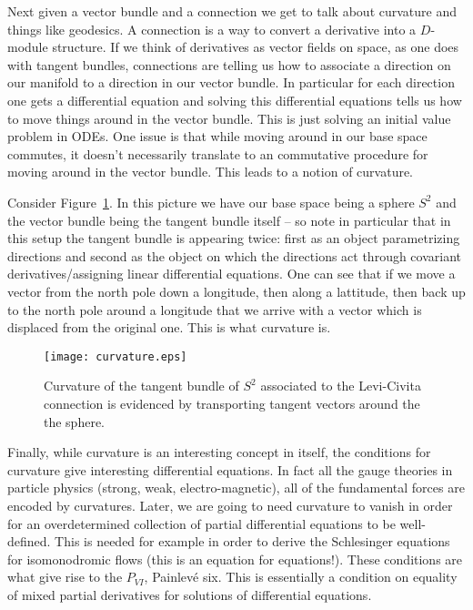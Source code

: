 \documentclass[12pt]{book}
\numberwithin{equation}{section}
\theoremstyle{definition}
\theoremstyle{remark}
\begin{document}
Next given a vector bundle and a connection we get to talk about curvature and things like geodesics. 
A connection is a way to convert a derivative into a $D$-module structure.
If we think of derivatives as vector fields on space, as one does with tangent bundles, connections are telling us how to associate a direction on our manifold to a direction in our vector bundle. 
In particular for each direction one gets a differential equation and solving this differential equations tells us how to move things around in the vector bundle. 
This is just solving an initial value problem in ODEs.
One issue is that while moving around in our base space commutes, it doesn't necessarily translate to an commutative procedure for moving around in the vector bundle. 
This leads to a notion of curvature. 

Consider Figure~\ref{F:curvature}. 
In this picture we have our base space being a sphere $S^2$ and the vector bundle being the tangent bundle itself -- so note in particular that in this setup the tangent bundle is appearing twice: first as an object parametrizing directions and second as the object on which the directions act through covariant derivatives/assigning linear differential equations.
One can see that if we move a vector from the north pole down a longitude, then along a lattitude, then back up to the north pole around a longitude that we arrive with a vector which is displaced from the original one. 
This is what curvature is.
\begin{figure}[h]\label{F:curvature}
	\begin{center}
		\texttt{[image: curvature.eps]}
	\end{center}
	\caption{Curvature of the tangent bundle of $S^2$ associated to the Levi-Civita connection is evidenced by transporting tangent vectors around the the sphere.}
\end{figure}

Finally, while curvature is an interesting concept in itself, the conditions for curvature give interesting differential equations. 
In fact all the gauge theories in particle physics (strong, weak, electro-magnetic), all of the fundamental forces are encoded by curvatures. 
Later, we are going to need curvature to vanish in order for an overdetermined collection of partial differential equations to be well-defined.
This is needed for example in order to derive the Schlesinger equations for isomonodromic flows (this is an equation for equations!).
These conditions are what give rise to the $P_{VI}$, Painlev\'e six.
This is essentially a condition on equality of mixed partial derivatives for solutions of differential equations. 
\end{document}
